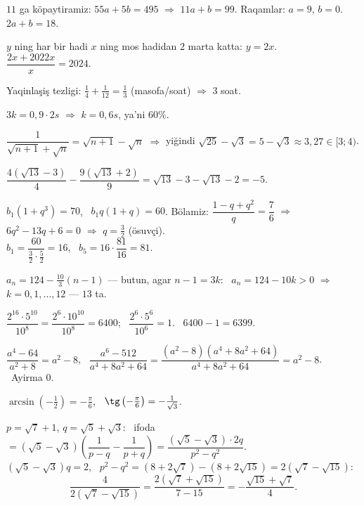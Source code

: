 




$11$ ga köpaytiramiz: $55a+5b=495$ $\Rightarrow$ $11a+b=99$. Raqamlar: $a=9$, $b=0$. \ $2a+b=18$.

$y$ ning har bir hadi $x$ ning mos hadidan $2$ marta katta: $y=2x$. \ $\dfrac{2x+2022x}x=2024$.

Yaqinlaşiş tezligi: $\frac14+\frac1{12}=\frac13$ (masofa/soat) $\Rightarrow$ $3$ soat.

$3k=0{,}9\cdot2s$ $\Rightarrow$ $k=0{,}6s$, ya'ni $60\%$.

$\dfrac1{\sqrt{n+1}+\sqrt n}=\sqrt{n+1}-\sqrt n$ $\Rightarrow$ yiğindi $\sqrt{25}-\sqrt3=5-\sqrt3\approx3{,}27\in[3;4)$.

$\dfrac{4\left(\sqrt{13}-3\right)}4-\dfrac{9\left(\sqrt{13}+2\right)}9=\sqrt{13}-3-\sqrt{13}-2=-5$.

$b_1\left(1+q^3\right)=70$, \ $b_1q(1+q)=60$. Bölamiz: $\dfrac{1-q+q^2}q=\dfrac76$ $\Rightarrow$ $6q^2-13q+6=0$ $\Rightarrow$ $q=\frac32$ (ösuvçi).\\
$b_1=\dfrac{60}{\frac32\cdot\frac52}=16$, \ $b_5=16\cdot\dfrac{81}{16}=81$.

$a_n=124-\frac{10}3(n-1)$ — butun, agar $n-1=3k$: \ $a_n=124-10k>0$ $\Rightarrow$ $k=0,1,\dots,12$ — $13$ ta.

$\dfrac{2^{16}\cdot5^{10}}{10^8}=\dfrac{2^6\cdot10^{10}}{10^8}=6400$; \ $\dfrac{2^6\cdot5^6}{10^6}=1$. \ $6400-1=6399$.

$\dfrac{a^4-64}{a^2+8}=a^2-8$, \ $\dfrac{a^6-512}{a^4+8a^2+64}=\dfrac{\left(a^2-8\right)\left(a^4+8a^2+64\right)}{a^4+8a^2+64}=a^2-8$. \ Ayirma $0$.

$\arcsin\left(-\frac12\right)=-\frac\pi6$, \ $\tg\left(-\frac\pi6\right)=-\frac1{\sqrt3}$.

$p=\sqrt7+1$, $q=\sqrt5+\sqrt3$: \ ifoda $=\left(\sqrt5-\sqrt3\right)\left(\dfrac1{p-q}-\dfrac1{p+q}\right)=\dfrac{\left(\sqrt5-\sqrt3\right)\cdot2q}{p^2-q^2}$.\\
$\left(\sqrt5-\sqrt3\right)q=2$, \ $p^2-q^2=\left(8+2\sqrt7\right)-\left(8+2\sqrt{15}\right)=2\left(\sqrt7-\sqrt{15}\right)$:
\[\frac4{2\left(\sqrt7-\sqrt{15}\right)}=\frac{2\left(\sqrt7+\sqrt{15}\right)}{7-15}=-\frac{\sqrt{15}+\sqrt7}4.\]

